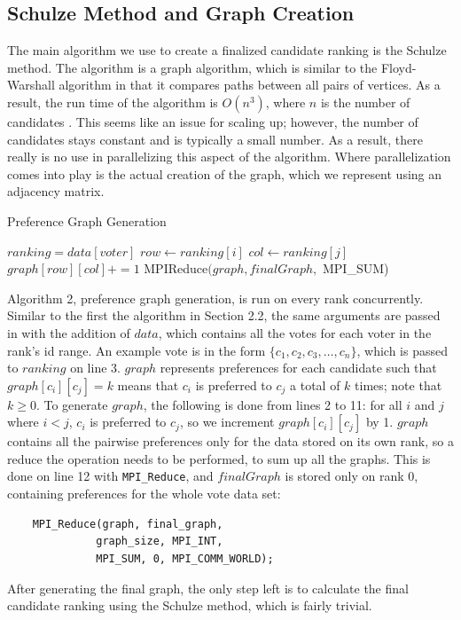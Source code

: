 \documentclass[final,5p,times,twocolumn,authoryear, 10pt]{elsarticle}
\newcommand{\C}[1]{\lstinline{#1}}
\begin{document}
\subsection{Schulze Method and Graph Creation}
\label{Schulze Method and Graph Creation}
The main algorithm we use to create a finalized candidate ranking is the
Schulze method. The algorithm is a graph algorithm, which is similar to the
Floyd-Warshall algorithm in that it compares paths between all pairs of
vertices. As a result, the run time of the algorithm is $O(n^3)$, where $n$ is
the number of candidates \cite{schulze1}. This seems like an issue for scaling
up; however, the number of candidates stays constant and is typically a small
number. As a result, there really is no use in parallelizing this aspect of the
algorithm. Where parallelization comes into play is the actual creation of the
graph, which we represent using an adjacency matrix.
\begin{algorithm}
    \caption{Preference Graph Generation}\label{alg:cap}
    \begin{algorithmic}[1]
        \State $ranking = data[voter]$ 
            \State $row \gets ranking[i]$
            \State $col \gets ranking[j]$
            \State $graph[row][col] += 1$
            \EndFor
        \EndFor
    \EndFor
    \State MPIReduce$(graph, finalGraph,$ MPI\_SUM)
    \EndProcedure
    \end{algorithmic}
\end{algorithm}

Algorithm 2, preference graph generation, is run on every rank concurrently.
Similar to the first the algorithm in Section 2.2, the same arguments are
passed in with the addition of $data$, which contains all the votes for each
voter in the rank's id range. An example vote is in the form $\{c_1, c_2, c_3,
\ldots, c_n\}$, which is passed to $ranking$ on line 3. $graph$ represents
preferences for each candidate such that $graph[c_i][c_j] = k$ means that $c_i$
is preferred to $c_j$ a total of $k$ times; note that $k \geq 0$. To generate
$graph$, the following is done from lines 2 to 11: for all $i$ and $j$ where $i
< j$, $c_i$ is preferred to $c_j$, so we increment $graph[c_i][c_j]$ by 1.
$graph$ contains all the pairwise preferences only for the data stored on its
own rank, so a reduce the operation needs to be performed, to sum up all the
graphs. This is done on line 12 with \C{MPI_Reduce}, and $finalGraph$ is stored
only on rank 0, containing preferences for the whole vote data set:
\begin{center}
    \begin{BVerbatim}
    MPI_Reduce(graph, final_graph, 
              graph_size, MPI_INT,
              MPI_SUM, 0, MPI_COMM_WORLD);
    \end{BVerbatim}
\end{center}
After generating the final graph, the only step left is to calculate the final
candidate ranking using the Schulze method, which is fairly trivial.
\end{document}
